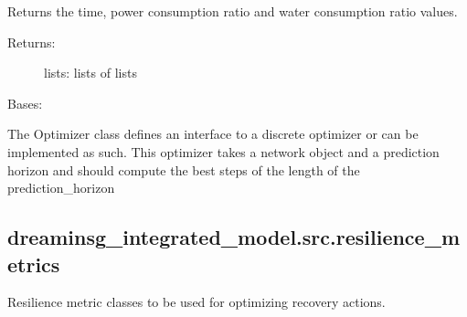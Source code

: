 \documentclass[letterpaper,10pt,english]{sphinxmanual}
\begin{document}
\begin{fulllineitems}

\begin{fulllineitems}
\label{\detokenize{apidoc:dreaminsg_integrated_model.src.optimizer.BruteForceOptimizer.get_trackers}}
\sphinxAtStartPar
Returns the time, power consumption ratio and water consumption ratio values.
\begin{description}
\item[{Returns:}] \leavevmode
\sphinxAtStartPar
lists: lists of lists

\end{description}

\end{fulllineitems}


\end{fulllineitems}


\begin{fulllineitems}
\label{\detokenize{apidoc:dreaminsg_integrated_model.src.optimizer.Optimizer}}
\sphinxAtStartPar
Bases: 

\sphinxAtStartPar
The Optimizer class defines an interface to a discrete optimizer or can be implemented as such. This optimizer takes a network object and a prediction horizon and should compute the best steps of the length of the prediction\_horizon

\end{fulllineitems}



\subsection{dreaminsg\_integrated\_model.src.resilience\_metrics}
\label{\detokenize{apidoc:dreaminsg-integrated-model-src-resilience-metrics}}\label{\detokenize{apidoc:module-dreaminsg_integrated_model.src.resilience_metrics}}
\sphinxAtStartPar
Resilience metric classes to be used for optimizing recovery actions.
\end{document}
